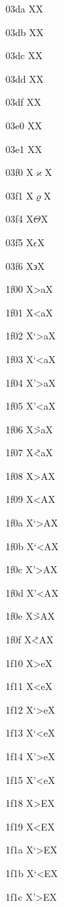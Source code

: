 \documentclass[11pt]{article}
\begin{document}
03da X{\textgreek{\Stigma}}X

03db X{\textgreek{\stigma}}X

03dc X{\textgreek{\Digamma}}X

03dd X{\textgreek{\digamma}}X

03df X{\textgreek{\koppa}}X

03e0 X{\textgreek{\Sampi}}X

03e1 X{\textgreek{\sampi}}X

03f0 X{\ensuremath{\varkappa}}X

03f1 X{\ensuremath{\varrho}}X

03f4 X{\ensuremath{\Theta}}X

03f5 X{\ensuremath{\epsilon}}X

03f6 X{\ensuremath{\backepsilon}}X

1f00 X{\textgreek{>a}}X

1f01 X{\textgreek{<a}}X

1f02 X{\textgreek{`>a}}X

1f03 X{\textgreek{`<a}}X

1f04 X{\textgreek{'>a}}X

1f05 X{\textgreek{'<a}}X

1f06 X{\textgreek{\~{>a}}}X

1f07 X{\textgreek{\~{<a}}}X

1f08 X{\textgreek{>A}}X

1f09 X{\textgreek{<A}}X

1f0a X{\textgreek{`>A}}X

1f0b X{\textgreek{`<A}}X

1f0c X{\textgreek{'>A}}X

1f0d X{\textgreek{'<A}}X

1f0e X{\textgreek{\~{>A}}}X

1f0f X{\textgreek{\~{<A}}}X

1f10 X{\textgreek{>e}}X

1f11 X{\textgreek{<e}}X

1f12 X{\textgreek{`>e}}X

1f13 X{\textgreek{`<e}}X

1f14 X{\textgreek{'>e}}X

1f15 X{\textgreek{'<e}}X

1f18 X{\textgreek{>E}}X

1f19 X{\textgreek{<E}}X

1f1a X{\textgreek{`>E}}X

1f1b X{\textgreek{`<E}}X

1f1c X{\textgreek{'>E}}X
\end{document}

